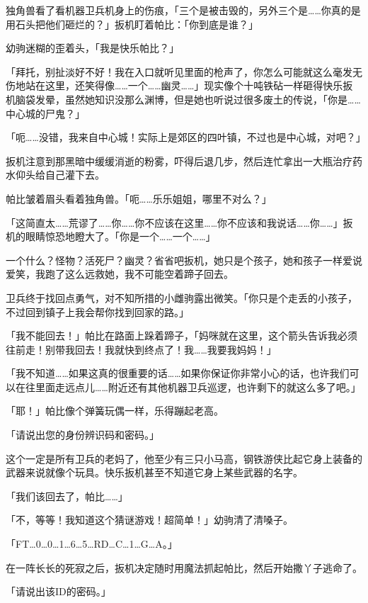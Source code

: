 独角兽看了看机器卫兵机身上的伤痕，「三个是被击毁的，另外三个是……你真的是用石头把他们砸烂的？」扳机盯着帕比：「你到底是谁？」

幼驹迷糊的歪着头，「我是快乐帕比？」

「拜托，别扯淡好不好！我在入口就听见里面的枪声了，你怎么可能就这么毫发无伤地站在这里，还笑得像……一个……幽灵……」现实像个十吨铁砧一样砸得快乐扳机脑袋发晕，虽然她知识没那么渊博，但是她也听说过很多废土的传说，「你是……中心城的尸鬼？」

「呃……没错，我来自中心城！实际上是郊区的四叶镇，不过也是中心城，对吧？」

扳机注意到那黑暗中缓缓消逝的粉雾，吓得后退几步，然后连忙拿出一大瓶治疗药水仰头给自己灌下去。

帕比皱着眉头看着独角兽。「呃……乐乐姐姐，哪里不对么？」

「这简直太……荒谬了……你……你不应该在这里……你不应该和我说话……你……」扳机的眼睛惊恐地瞪大了。「你是一个……一个……」

一个什么？怪物？活死尸？幽灵？省省吧扳机，她只是个孩子，她和孩子一样爱说爱笑，我跑了这么远救她，我不可能空着蹄子回去。

卫兵终于找回点勇气，对不知所措的小雌驹露出微笑。「你只是个走丢的小孩子，不过回到镇子上我会帮你找到回家的路。」

「我不能回去！」帕比在路面上跺着蹄子，「妈咪就在这里，这个箭头告诉我必须往前走！别带我回去！我就快到终点了！我……我要我妈妈！」

「我不知道……如果这真的很重要的话……如果你保证你非常小心的话，也许我们可以在往里面走远点儿……附近还有其他机器卫兵巡逻，也许剩下的就这么多了吧。」

「耶！」帕比像个弹簧玩偶一样，乐得蹦起老高。

\horizonline


「{\mtzh 请说出您的身份辨识码和密码。}」

这个一定是所有卫兵的老妈了，他至少有三只小马高，钢铁游侠比起它身上装备的武器来说就像个玩具。快乐扳机甚至不知道它身上某些武器的名字。

「我们该回去了，帕比……」

「不，等等！我知道这个猜谜游戏！超简单！」幼驹清了清嗓子。

「FT\dots 0\dots 0\dots 1\dots 6\dots 5\dots RD\dots C\dots 1\dots G\dots A。」

在一阵长长的死寂之后，扳机决定随时用魔法抓起帕比，然后开始撒丫子逃命了。

「{\mtzh 请说出该ID的密码。}」

